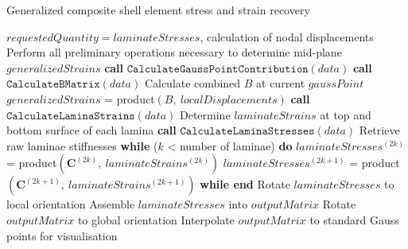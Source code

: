 \begin{algorithm}
	\onehalfspacing
	\caption{Generalized composite shell element stress and strain recovery}
	\label{general composite shell stress pseudocode}
	\begin{algorithmic}[1]
		\Require $requestedQuantity = laminateStresses$, calculation of nodal displacements
		\State Perform all preliminary operations necessary to determine mid-plane $generalizedStrains$
		\State \textbf{call} $\texttt{CalculateGaussPointContribution}(data)$
		\State \hspace{\algorithmicindent}\textbf{call} $\texttt{CalculateBMatrix}(data)$
		\State \hspace{\algorithmicindent}\hspace{\algorithmicindent} Calculate combined $B$ at current $gaussPoint$
		\State $generalizedStrains$ = product$(B,\ localDisplacements)$
		\State \textbf{call} $\texttt{CalculateLaminaStrains}(data)$
		\State \hspace{\algorithmicindent}Determine $laminateStrains$ at top and bottom surface of each lamina 
		\State \textbf{call} $\texttt{CalculateLaminaStresses}(data)$
		\State \hspace{\algorithmicindent}Retrieve raw laminae stiffnesses
		\State \hspace{\algorithmicindent}\textbf{while} ($k$ < number of laminae) \textbf{do}
		\State \hspace{\algorithmicindent} \hspace{\algorithmicindent}$laminateStresses^{(2k)}$ = product$(\mathbf{C}^{(2k)},\ laminateStrains^{(2k)})$
		\State \hspace{\algorithmicindent} \hspace{\algorithmicindent}$laminateStresses^{(2k+1)}$ = product$(\mathbf{C}^{(2k+1)},\ laminateStrains^{(2k+1)})$
		\State \hspace{\algorithmicindent}\textbf{while end}
		\State Rotate $laminateStresses$ to local orientation
		\EndIf
		\State Assemble $laminateStresses$ into $outputMatrix$
		\State Rotate $outputMatrix$ to global orientation
		\EndIf
		\State Interpolate $outputMatrix$ to standard Gauss points for visualisation
		\EndWhile
	\end{algorithmic}
\end{algorithm}